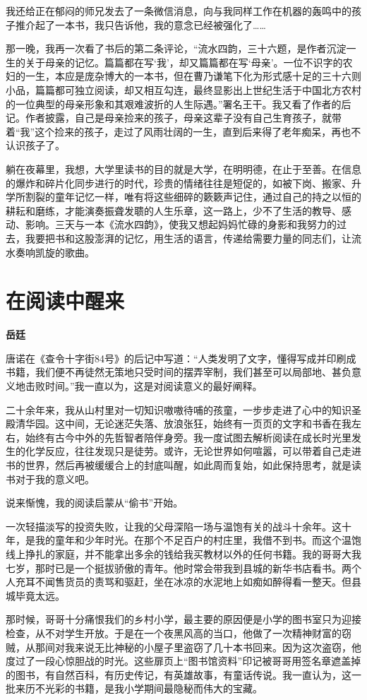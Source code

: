 \documentclass[openany,scheme = chinese, linespread = 1.5]{ctexbook}
\newcommand \name[1]{\begin{center} \kaishu \Large \bfseries #1 \end{center}}
\begin{document}
我还给正在郁闷的师兄发去了一条微信消息，向与我同样工作在机器的轰鸣中的孩子推介起了一本书，我只告诉他，我的意念已经被强化了……

那一晚，我再一次看了书后的第二条评论，“流水四韵，三十六题，是作者沉淀一生的关于母亲的记忆。篇篇都在写‘我’，却又篇篇都在写‘母亲’。一位不识字的农妇的一生，本应是庞杂博大的一本书，但在曹乃谦笔下化为形式感十足的三十六则小品，篇篇都可独立阅读，却又相互勾连，最终显影出上世纪生活于中国北方农村的一位典型的母亲形象和其艰难波折的人生际遇。”署名王干。我又看了作者的后记。作者披露，自己是母亲捡来的孩子，母亲这辈子没有自己生育孩子，就带着“我”这个捡来的孩子，走过了风雨壮阔的一生，直到后来得了老年痴呆，再也不认识孩子了。

躺在夜幕里，我想，大学里读书的目的就是大学，在明明德，在止于至善。在信息的爆炸和碎片化同步进行的时代，珍贵的情绪往往是短促的，如被下岗、搬家、升学所割裂的童年记忆一样，唯有将这些细碎的簌簌声记住，通过自己的持之以恒的耕耘和磨练，才能演奏振聋发聩的人生乐章，这一路上，少不了生活的教导、感动、影响。三天与一本《流水四韵》，使我又想起妈妈忙碌的身影和我努力的过去，我要把书和这股澎湃的记忆，用生活的语言，传递给需要力量的同志们，让流水奏响凯旋的歌曲。
\newpage

\section{在阅读中醒来}
\name{岳廷}

唐诺在《查令十字街84号》的后记中写道：“人类发明了文字，懂得写成并印刷成书籍，我们便不再徒然无策地只受时间的摆弄宰制，我们甚至可以局部地、甚负意义地击败时间。”我一直以为，这是对阅读意义的最好阐释。

二十余年来，我从山村里对一切知识嗷嗷待哺的孩童，一步步走进了心中的知识圣殿清华园。这中间，无论迷茫失落、放浪张狂，始终有一页页的文字和书香在我左右，始终有古今中外的先哲智者陪伴身旁。我一度试图去解析阅读在成长时光里发生的化学反应，往往发现只是徒劳。或许，无论世界如何喧嚣，可以带着自己走进书的世界，然后再被缓缓合上的封底叫醒，如此周而复始，如此保持思考，就是读书对于我的意义吧。

说来惭愧，我的阅读启蒙从“偷书”开始。

一次轻描淡写的投资失败，让我的父母深陷一场与温饱有关的战斗十余年。这十年，是我的童年和少年时光。在那个不足百户的村庄里，我借不到书。而这个温饱线上挣扎的家庭，并不能拿出多余的钱给我买教材以外的任何书籍。我的哥哥大我七岁，那时已是一个挺拔骄傲的青年。他时常会带我到县城的新华书店看书。两个人充耳不闻售货员的责骂和驱赶，坐在冰凉的水泥地上如痴如醉得看一整天。但县城毕竟太远。

那时候，哥哥十分痛恨我们的乡村小学，最主要的原因便是小学的图书室只为迎接检查，从不对学生开放。于是在一个夜黑风高的当口，他做了一次精神财富的窃贼，从那间对我来说无比神秘的小屋子里盗窃了几十本书回来。因为这次盗窃，他度过了一段心惊胆战的时光。这些扉页上“图书馆资料”印记被哥哥用签名章遮盖掉的图书，有自然百科，有历史传记，有英雄故事，有童话传说。我一直认为，这一批来历不光彩的书籍，是我小学期间最隐秘而伟大的宝藏。
\end{document}
